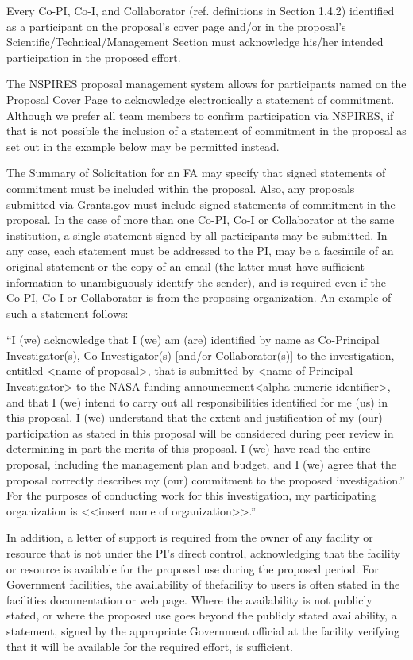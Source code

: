 \documentclass[12pt]{article}
\begin{document}
Every Co-PI, Co-I, and Collaborator (ref. definitions in Section
1.4.2) identified as a participant on the proposal's cover page and/or
in the proposal's Scientific/Technical/Management Section must
acknowledge his/her intended participation in the proposed effort.

The NSPIRES proposal management system allows for participants named
on the Proposal Cover Page to acknowledge electronically a statement
of commitment. Although we prefer all team members to confirm
participation via NSPIRES, if that is not possible the inclusion of a
statement of commitment in the proposal as set out in the example
below may be permitted instead.

The Summary of Solicitation for an FA may specify that signed
statements of commitment must be included within the proposal. Also,
any proposals submitted via Grants.gov must include signed statements
of commitment in the proposal. In the case of more than one Co-PI,
Co-I or Collaborator at the same institution, a single statement
signed by all participants may be submitted. In any case, each
statement must be addressed to the PI, may be a facsimile of an
original statement or the copy of an email (the latter must have
sufficient information to unambiguously identify the sender), and is
required even if the Co-PI, Co-I or Collaborator is from the proposing
organization. An example of such a statement follows:

``I (we) acknowledge that I (we) am (are) identified by name as
Co-Principal Investigator(s), Co-Investigator(s) [and/or
Collaborator(s)] to the investigation, entitled <name of proposal>,
that is submitted by <name of Principal Investigator> to the NASA
funding announcement<alpha-numeric identifier>, and that I (we) intend
to carry out all responsibilities identified for me (us) in this
proposal. I (we) understand that the extent and justification of my
(our) participation as stated in this proposal will be considered
during peer review in determining in part the merits of this
proposal. I (we) have read the entire proposal, including the
management plan and budget, and I (we) agree that the proposal
correctly describes my (our) commitment to the proposed
investigation.'' For the purposes of conducting work for this
investigation, my participating organization is <<insert name of
organization>>.''

In addition, a letter of support is required from the owner of any
facility or resource that is not under the PI's direct control,
acknowledging that the facility or resource is available for the
proposed use during the proposed period. For Government facilities,
the availability of thefacility to users is often stated in the
facilities documentation or web page. Where the availability is not
publicly stated, or where the proposed use goes beyond the publicly
stated availability, a statement, signed by the appropriate Government
official at the facility verifying that it will be available for the
required effort, is sufficient.
\end{document}
